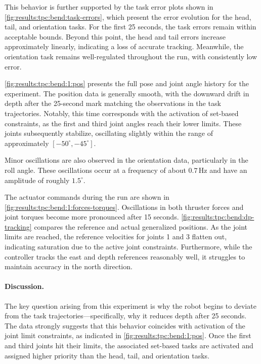 This behavior is further supported by the task error plots shown in \autoref{fig:results:tpc:bend:task-errors}, which present the error evolution for the head, tail, and orientation tasks. For the first 25 seconds, the task errors remain within acceptable bounds. Beyond this point, the head and tail errors increase approximately linearly, indicating a loss of accurate tracking. Meanwhile, the orientation task remains well-regulated throughout the run, with consistently low error.

\autoref{fig:results:tpc:bend:1:pos} presents the full pose and joint angle history for the experiment. The position data is generally smooth, with the downward drift in depth after the 25-second mark matching the observations in the task trajectories. Notably, this time corresponds with the activation of set-based constraints, as the first and third joint angles reach their lower limits. These joints subsequently stabilize, oscillating slightly within the range of approximately \([-50^\circ, -45^\circ]\).

Minor oscillations are also observed in the orientation data, particularly in the roll angle. These oscillations occur at a frequency of about \(0.7\,\mathrm{Hz}\) and have an amplitude of roughly \(1.5^\circ\).

The actuator commands during the run are shown in \autoref{fig:results:tpc:bend:1:forces-torques}. Oscillations in both thruster forces and joint torques become more pronounced after 15 seconds. \autoref{fig:results:tpc:bend:dp-tracking} compares the reference and actual generalized positions. As the joint limits are reached, the reference velocities for joints 1 and 3 flatten out, indicating saturation due to the active joint constraints. Furthermore, while the controller tracks the east and depth references reasonably well, it struggles to maintain accuracy in the north direction.

\paragraph{Discussion.}

The key question arising from this experiment is why the robot begins to deviate from the task trajectories—specifically, why it reduces depth after 25 seconds. The data strongly suggests that this behavior coincides with activation of the joint limit constraints, as indicated in \autoref{fig:results:tpc:bend:1:pos}. Once the first and third joints hit their limits, the associated set-based tasks are activated and assigned higher priority than the head, tail, and orientation tasks.

